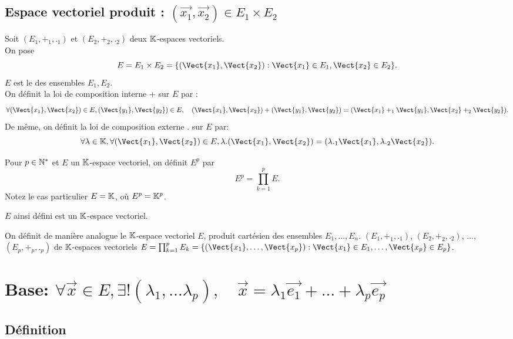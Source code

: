 \documentclass{book}
\begin{document}
\subsection{Espace vectoriel produit : $(\vec{x_1},\vec{x_2})\in E_1\times E_2$}
\begin{Definition}
Soit $(E_1, +_1, ._1)$ et $(E_2, +_2, ._2)$ deux $\mathbb{K} $-espaces vectoriels.\\
On pose \[ E = E_1\times E_2 = \{ (\Vect{x_1},\Vect{x_2}) : \Vect{x_1}\in E_1, \Vect{x_2}\in E_2 \}. \]
$E$ est le  des ensembles $E_1, E_2$.\\
On définit la loi de composition interne $+$ sur $E$ par : 
$$\forall (\Vect{x_1},\Vect{x_2})\in E, (\Vect{y_1},\Vect{y_2})\in E,\quad (\Vect{x_1},\Vect{x_2})+(\Vect{y_1},\Vect{y_2}) =  (\Vect{x_1}+_1\Vect{y_1},\Vect{x_2}+_2\Vect{y_2}). $$
De même, on définit la loi de composition externe $.$ sur $E$ par:
$$\forall \lambda \in \K,\forall (\Vect{x_1},\Vect{x_2}) \in E,
 \lambda . (\Vect{x_1},\Vect{x_2}) =(\lambda ._1\Vect{x_1},\lambda ._2\Vect{x_2}).$$
 \end{Definition}
 \begin{Exemple}
Pour $p\in \mathbb{N}^*$ et $E$ un $\mathbb{K} $-espace vectoriel, on définit $E^p$ par \[ E^p = \prod_{k=1}^p E. \]
Notez le cas particulier $E = \mathbb{K} $, où $E^p=\mathbb{K}^p$.  
 \end{Exemple}
\begin{Proposition}
$E$ ainsi défini est un $\mathbb{K} $-espace vectoriel.
\end{Proposition}
\begin{Definition} 
On définit de manière analogue le $\mathbb{K} $-espace vectoriel $E$,  produit cartésien des ensembles $E_1, \dots, E_n$.  $(E_1, +_1, ._1)$, $(E_2, +_2, ._2)$, ..., $(E_p, +_p, ._p)$ de $\mathbb{K} $-espaces vectoriels $ E = \prod_{k=1}^p E_k = \{ (\Vect{x_1},\dots, \Vect{x_p}): \Vect{x_1}\in E_1, \dots, \Vect{x_p}\in E_p \}$.
\end{Definition}




\section{Base: $\forall \vec{x}\in E, \exists !(\lambda_1,\dots \lambda_p),\quad \vec{x} = \lambda_1 \vec{e_1}+\dots +\lambda_p \vec{e_p}$}
\subsection{Définition}
\end{document}
